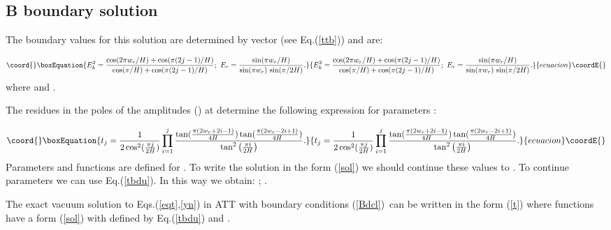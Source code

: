 \documentclass[a4paper,12pt,titlepage,final]{article}
\begin{document}
\subsection{B\coordHE{} boundary solution}

The boundary values for this solution are determined by vector
\coordHE{} (see Eq.(\ref{ttb})) and are:

\begin{equation}\coord{}\boxEquation{
E_{k}^{2}=\frac{\cos (2\pi w_{r}/H)+\cos (\pi (2j-1)/H)}{\cos (\pi /H)+\cos
(\pi (2j-1)/H)};~E_{r}=\frac{\sin (\pi w_{r}/H)}{\sin (\pi w_{r})
\,\sin (\pi/2H)}.  \label{bde}
}{
E_{k}^{2}=\frac{\cos (2\pi w_{r}/H)+\cos (\pi (2j-1)/H)}{\cos (\pi /H)+\cos
(\pi (2j-1)/H)};~E_{r}=\frac{\sin (\pi w_{r}/H)}{\sin (\pi w_{r})
\,\sin (\pi/2H)}.  }{ecuacion}\coordE{}\end{equation}
where \coordHE{} and \coordHE{}.

The residues in the poles of the amplitudes \coordHE{} (\coordHE{})
at \coordHE{} determine the following expression for parameters
\coordHE{}:

\begin{equation}\coord{}\boxEquation{
t_{j}=\frac{1}{2\cos ^{2}(\frac{\pi j}{2H})}\prod_{i=1}^{j}
\frac{\tan (\frac{\pi (2w_{r}+2i-1)}{4H})
\tan (\frac{\pi (2w_{r}-2i+1)}{4H})}
{\tan ^{2}\left(
\frac{\pi i}{2H}\right) }.  \label{tbdu}
}{
t_{j}=\frac{1}{2\cos ^{2}(\frac{\pi j}{2H})}\prod_{i=1}^{j}
\frac{\tan (\frac{\pi (2w_{r}+2i-1)}{4H})
\tan (\frac{\pi (2w_{r}-2i+1)}{4H})}
{\tan ^{2}\left(
\frac{\pi i}{2H}\right) }.  }{ecuacion}\coordE{}\end{equation}
Parameters \coordHE{} and functions \coordHE{}
are defined for \coordHE{}. To write the solution in the form (\ref{sol})
we should continue these values to \coordHE{}. To continue parameters
\coordHE{} we can use Eq.(\ref{tbdu}). In this way we obtain:
\coordHE{}; \coordHE{}.

The exact vacuum solution to Eqs.(\ref{eqt},\ref{yn}) in \coordHE{} ATT
with boundary conditions (\ref{Bdcl})\ can be written in the form (\ref{t})
where functions \coordHE{} have a form (\ref{sol}) with \coordHE{} defined
by Eq.(\ref{tbdu}) and \coordHE{}.
\end{document}
